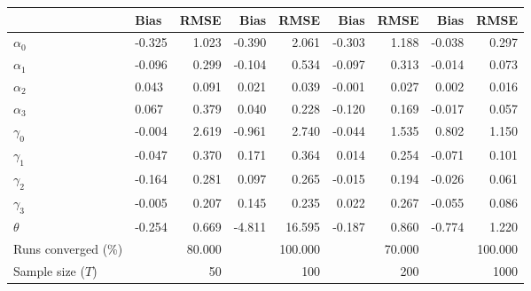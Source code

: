 
\begin{tabular}[t]{llrrrrrrr}
\toprule
  & Bias & RMSE & Bias & RMSE & Bias & RMSE & Bias & RMSE\\
\midrule
$\alpha_{0}$ & -0.325 & 1.023 & -0.390 & 2.061 & -0.303 & 1.188 & -0.038 & 0.297\\
$\alpha_{1}$ & -0.096 & 0.299 & -0.104 & 0.534 & -0.097 & 0.313 & -0.014 & 0.073\\
$\alpha_{2}$ & 0.043 & 0.091 & 0.021 & 0.039 & -0.001 & 0.027 & 0.002 & 0.016\\
$\alpha_{3}$ & 0.067 & 0.379 & 0.040 & 0.228 & -0.120 & 0.169 & -0.017 & 0.057\\
$\gamma_{0}$ & -0.004 & 2.619 & -0.961 & 2.740 & -0.044 & 1.535 & 0.802 & 1.150\\
$\gamma_{1}$ & -0.047 & 0.370 & 0.171 & 0.364 & 0.014 & 0.254 & -0.071 & 0.101\\
$\gamma_{2}$ & -0.164 & 0.281 & 0.097 & 0.265 & -0.015 & 0.194 & -0.026 & 0.061\\
$\gamma_{3}$ & -0.005 & 0.207 & 0.145 & 0.235 & 0.022 & 0.267 & -0.055 & 0.086\\
$\theta$ & -0.254 & 0.669 & -4.811 & 16.595 & -0.187 & 0.860 & -0.774 & 1.220\\
Runs converged (\%) &  & 80.000 &  & 100.000 &  & 70.000 &  & 100.000\\
Sample size ($T$) &  & 50 &  & 100 &  & 200 &  & 1000\\
\bottomrule
\end{tabular}
